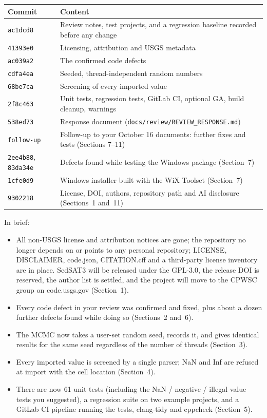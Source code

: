 \documentclass[11pt]{article}
\newcommand{\code}[1]{\texttt{#1}}
\newcommand{\commit}[1]{\texttt{#1}}
\begin{document}
\begin{center}
\small
\begin{tabularx}{\linewidth}{@{}lX@{}}
\toprule
Commit & Content\\
\midrule
\commit{ac1dcd8} & Review notes, test projects, and a regression baseline recorded before any change\\
\commit{41393e0} & Licensing, attribution and USGS metadata\\
\commit{ac039a2} & The confirmed code defects\\
\commit{cdfa4ea} & Seeded, thread-independent random numbers\\
\commit{68be7ca} & Screening of every imported value\\
\commit{2f8c463} & Unit tests, regression tests, GitLab CI, optional GA, build cleanup, warnings\\
\commit{538ed73} & Response document (\code{docs/\allowbreak{}review/\allowbreak{}REVIEW\_\allowbreak{}RESPONSE.\allowbreak{}md})\\
\commit{follow-up} & Follow-up to your October 16 documents: further fixes and tests (Sections 7--11)\\
\commit{2ee4b88}, \commit{83da34e} & Defects found while testing the Windows package (Section~7)\\
\commit{1cfe0d9} & Windows installer built with the WiX Toolset (Section~7)\\
\commit{9302218} & License, DOI, authors, repository path and AI disclosure (Sections~1 and~11)\\
\bottomrule
\end{tabularx}
\end{center}

In brief:
\begin{itemize}[nosep]
\item All non-USGS license and attribution notices are gone; the repository
  no longer depends on or points to any personal repository; LICENSE,
  DISCLAIMER, code.json, CITATION.cff and a third-party license inventory are
  in place. SedSAT3 will be released under the GPL-3.0, the release DOI is
  reserved, the author list is settled, and the project will move to the
  CPWSC group on code.usgs.gov (Section~1).
\item Every code defect in your review was confirmed and fixed, plus about a
  dozen further defects found while doing so (Sections~2 and~6).
\item The MCMC now takes a user-set random seed, records it, and gives
  identical results for the same seed regardless of the number of threads
  (Section~3).
\item Every imported value is screened by a single parser; NaN and Inf are
  refused at import with the cell location (Section~4).
\item There are now 61 unit tests (including the NaN / negative / illegal
  value tests you suggested), a regression suite on two example projects,
  and a GitLab CI pipeline running the tests, clang-tidy and cppcheck
  (Section~5).
\end{itemize}
\end{document}

